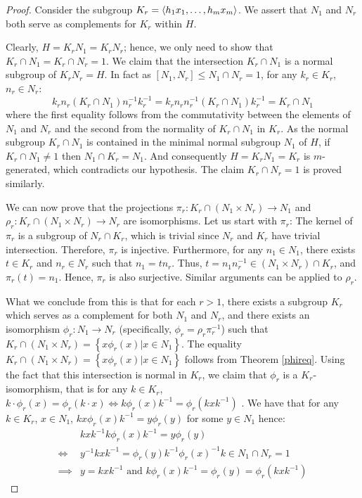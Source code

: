 \begin{proof}
    Consider the subgroup $K_r = \langle h_1x_1,\ldots ,h_mx_m \rangle$. We assert that $N_1$ and $N_r$ both serve as complements for $K_r$ within $H$.
    
    Clearly, $H = K_rN_1 = K_rN_r$; hence, we only need to show that $K_r \cap N_1 = K_r \cap N_r = 1$. We claim that the intersection $K_r \cap N_1$ is a normal subgroup of $K_rN_r = H$. In fact as $[N_1, N_r] \le N_1 \cap N_r = 1$, for any $k_r \in K_r$, $n_r \in N_r$:
    $$ 
    k_rn_r(K_r \cap N_1)n_r^{-1}k_r^{-1} = k_rn_rn_r^{-1}(K_r \cap N_1)k_r^{-1} = K_r \cap N_1 
    $$
    where the first equality follows from the commutativity between the elements of $N_1$ and $N_r$ and the second from the normality of $K_r \cap N_1$ in $K_r$.
    As the normal subgroup $K_r \cap N_1$ is contained in the minimal normal subgroup $N_1$ of $H$, if $K_r \cap N_1 \ne 1$ then $N_1 \cap K_r = N_1$. And consequently $H = K_rN_1 = K_r$ is $m$-generated, which contradicts our hypothesis. The claim $K_r \cap N_r = 1$ is proved similarly.

    We can now prove that the projections $\pi_r : K_r \cap (N_1 \times N_r) \rightarrow N_1$ and $\rho_r : K_r \cap (N_1 \times N_r) \rightarrow N_r$ are isomorphisms. 
    Let us start with $\pi_r$: The kernel of $\pi_r$ is a subgroup of $N_r \cap K_r$, which is trivial since $N_r$ and $K_r$ have trivial intersection. Therefore, $\pi_r$ is injective. 
    Furthermore, for any $n_1 \in N_1$, there exists $t \in K_r$ and $n_r \in N_r$ such that $n_1 = tn_r$. Thus, $t = n_1n_r^{-1} \in (N_1 \times N_r) \cap K_r$, and $\pi_r(t) = n_1$. Hence, $\pi_r$ is also surjective.
    Similar arguments can be applied to $\rho_r$.

    What we conclude from this is that for each $r > 1$, there exists a subgroup $K_r$ which serves as a complement for both $N_1$ and $N_r$, and there exists an isomorphism $\phi_r : N_1 \rightarrow N_r$ (specifically, $\phi_r = \rho_r\pi_r^{-1}$) such that $K_r \cap (N_1 \times N_r) = \left\{x\phi_r(x) | x \in N_1\right\}$. 
    The equality $K_r \cap (N_1 \times N_r) = \left\{x\phi_r(x) | x \in N_1\right\}$ follows from Theorem \ref{phireq}.
    Using the fact that this intersection is normal in $K_r$, we claim that $\phi_r$ is a $K_r$-isomorphism, that is for any $k \in K_r$, $k \cdot \phi_r(x) = \phi_r(k \cdot x) \iff k\phi_r(x)k^{-1} = \phi_r(kxk^{-1})$ . We have that for any $k \in K_r$, $x \in N_1$, $kx\phi_r(x)k^{-1} = y\phi_r(y)$ for some $y \in N_1$ hence:
    \begin{align*}
        &kxk^{-1}k\phi_r(x)k^{-1} = y\phi_r(y)\\
        \iff &y^{-1}kxk^{-1} = \phi_r(y)k^{-1}\phi_r(x)^{-1}k \in N_1 \cap N_r = 1\\
        \implies &y = kxk^{-1} \text{ and } k\phi_r(x)k^{-1} = \phi_r(y) = \phi_r(kxk^{-1})
    \end{align*}


\end{proof}
